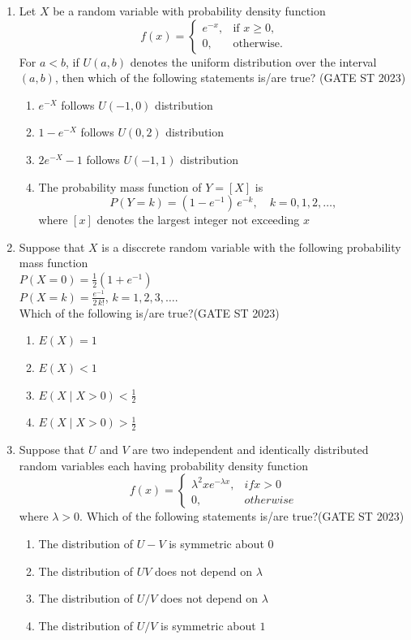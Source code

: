 \documentclass[journal]{IEEEtran}
\begin{document}
\begin{enumerate}[label=\textbf{Q.\arabic*.}, start=11, align=left, itemsep=2em]
\item Let $X$ be a random variable with probability density function  
\[
f(x) = 
\begin{cases}
e^{-x}, & \text{if } x \ge 0, \\
0, & \text{otherwise}.
\end{cases}
\]
For $a < b$, if $U(a, b)$ denotes the uniform distribution over the interval $(a, b)$,  
then which of the following statements is/are true?  \hfill(GATE ST 2023)

\begin{enumerate}
    \item $e^{-X}$ follows $U(-1, 0)$ distribution
    \item $1 - e^{-X}$ follows $U(0, 2)$ distribution
    \item $2 e^{-X} - 1$ follows $U(-1, 1)$ distribution
    \item The probability mass function of $Y = [X]$ is  
    \[
    P(Y = k) = (1 - e^{-1}) \, e^{-k}, \quad k = 0, 1, 2, \dots,
    \]
    where $[x]$ denotes the largest integer not exceeding $x$
\end{enumerate}



\item Suppose that $X$ is a disccrete random variable with the following probability mass function \\

$P(X=0) = \frac12(1 + e^{-1})$\\ 

$P(X=k) = \frac{e^{-1}}{2\,k!}$, $k=1,2,3,\dots$. \\

Which of the following is/are true?\hfill(GATE ST 2023)
\begin{enumerate}
\item $E(X) = 1$
\item $E(X) < 1$
\item $E(X \mid X > 0) < \frac12$
\item $E(X \mid X > 0) > \frac12$
\end{enumerate}

\item Suppose that $U$ and $V$ are two independent and identically distributed random variables each having probability density function \[
f(x) = \begin{cases}
\lambda^2 x e^{-\lambda x}, & if x>0 \\
0, & otherwise
\end{cases}
\]
where $\lambda >0$. Which of the following statements is/are true?\hfill(GATE ST 2023)
\begin{enumerate}
\item The distribution of $U - V$ is symmetric about $0$
\item The distribution of $UV$ does not depend on $\lambda$
\item The distribution of $U/V$ does not depend on $\lambda$
\item The distribution of $U/V$ is symmetric about $1$
\end{enumerate}


\end{enumerate}
\end{document}
